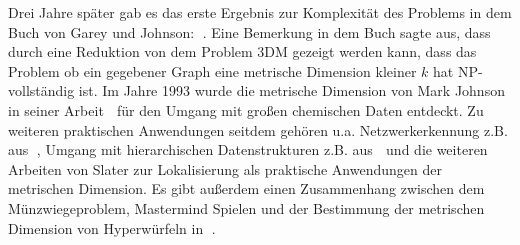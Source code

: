 Drei Jahre später gab es das erste Ergebnis zur Komplexität des Problems in dem Buch von Garey und Johnson: \grqq$\;$\cite{book}. Eine Bemerkung in dem Buch sagte aus, dass durch eine Reduktion von dem Problem 3DM gezeigt werden kann, dass das Problem ob ein gegebener Graph eine metrische Dimension kleiner $k$ hat NP-vollständig ist. Im Jahre 1993 wurde die metrische Dimension  von Mark Johnson in seiner Arbeit \grqq$\;$\cite{drug} für den Umgang mit großen chemischen Daten entdeckt. Zu weiteren praktischen Anwendungen seitdem gehören u.a. Netzwerkerkennung z.B. aus \grqq$\;$\cite{netzwerk}, Umgang mit hierarchischen Datenstrukturen z.B. aus \grqq$\;$\cite{hier} und die weiteren Arbeiten von Slater zur Lokalisierung als praktische Anwendungen der metrischen Dimension. Es gibt außerdem einen Zusammenhang zwischen dem Münzwiegeproblem, Mastermind Spielen und der Bestimmung der metrischen Dimension von Hyperwürfeln in \grqq$\;$\cite{tannier}.\newpage

